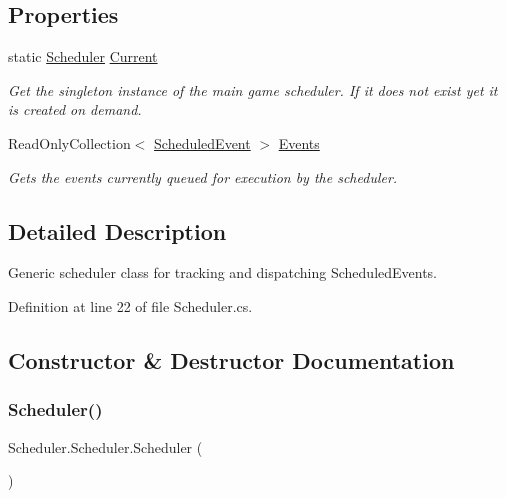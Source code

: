 \subsection*{Properties}
\begin{DoxyCompactItemize}
\item 
static \hyperlink{class_scheduler_1_1_scheduler}{Scheduler} \hyperlink{class_scheduler_1_1_scheduler_a66617179c19d1dd759b5eec0fb538907}{Current}
\begin{DoxyCompactList}\small\item\em Get the singleton instance of the main game scheduler. If it does not exist yet it is created on demand. \end{DoxyCompactList}\item 
Read\+Only\+Collection$<$ \hyperlink{class_scheduler_1_1_scheduled_event}{Scheduled\+Event} $>$ \hyperlink{class_scheduler_1_1_scheduler_a78cb7c8fd7f08a284064373b350ddd4d}{Events}
\begin{DoxyCompactList}\small\item\em Gets the events currently queued for execution by the scheduler. \end{DoxyCompactList}\end{DoxyCompactItemize}


\subsection{Detailed Description}
Generic scheduler class for tracking and dispatching Scheduled\+Events. 



Definition at line 22 of file Scheduler.\+cs.



\subsection{Constructor \& Destructor Documentation}
\mbox{\label{class_scheduler_1_1_scheduler_a0e6742111304fdc40c80b819da24d3f7}} 
\subsubsection{\texorpdfstring{Scheduler()}{Scheduler()}}
{\footnotesize\ttfamily Scheduler.\+Scheduler.\+Scheduler (\begin{DoxyParamCaption}{ }\end{DoxyParamCaption})}



